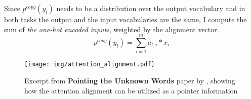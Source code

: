 Since $p^{copy}(y_t)$ needs to be a distribution over the output vocabulary and in both tasks the output and the input vocabularies are the same, I compute the sum of \emph{the one-hot encoded inputs}, weighted by the alignment vector.
\begin{equation}
    p^{copy}(y_t) = \sum_{i=1}^m{a_{t,i} * x_i}
\end{equation}

\begin{figure}
    \texttt{[image: img/attention\_alignment.pdf]}
    \caption{Excerpt from \textbf{Pointing the Unknown Words} paper by \citep{gulcehre2016pointing}, showing how the attention alignment can be utilized as a pointer information}
\end{figure}